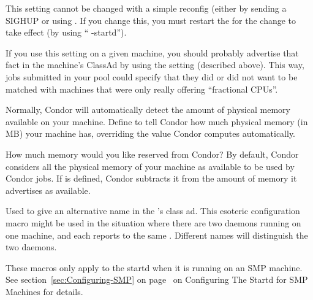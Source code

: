 \begin{description}
  \Note This setting cannot be changed with a simple reconfig (either
  by sending a SIGHUP or using .
  If you change this, you must restart the  for the
  change to take effect (by using `` -startd'').

  \Note If you use this setting on a given machine, you should
  probably advertise that fact in the machine's ClassAd by using the
   setting (described above).
  This way, jobs submitted in your pool could specify that they did or
  did not want to be matched with machines that were only really
  offering ``fractional CPUs''.

\item[\Macro{MEMORY}] \label{param:Memory}
  Normally, Condor will automatically detect the amount of physical
  memory available on your machine.  Define  to tell
  Condor how much physical memory (in MB) your machine has, overriding
  the value Condor computes automatically.

\item[\Macro{RESERVED\_MEMORY}] \label{param:ReservedMemory}
  How much memory would you like reserved from Condor?  By default,
  Condor considers all the physical memory of your machine as
  available to be used by Condor jobs.  If  is
  defined, Condor subtracts it from the amount of memory it advertises
  as available.

\item[\Macro{STARTD\_NAME}] \label{param:StartdName}
  Used to give an alternative name in the 's
  class ad.
  This esoteric configuration macro might be used in the situation
  where there are two  daemons running on one machine,
  and each reports to the same .
  Different names will distinguish the two daemons.

\end{description}

These macros only apply to the startd when it is running on an
SMP machine. 
See section~\ref{sec:Configuring-SMP} on
page~\pageref{sec:Configuring-SMP} on Configuring The Startd for 
SMP Machines for details.

